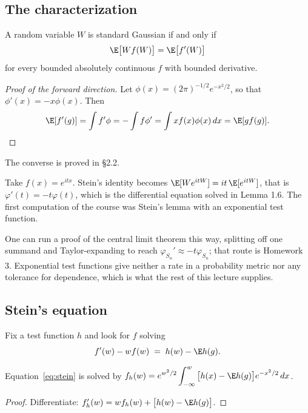 \documentclass[11pt]{article}
\begin{document}
\subsection{The characterization}

\begin{theorem}\label{thm:stein}
A random variable $W$ is standard Gaussian if and only if
\[
\E\big[Wf(W)\big]=\E\big[f'(W)\big]
\]
for every bounded absolutely continuous $f$ with bounded derivative.
\end{theorem}

\begin{proof}[Proof of the forward direction]
Let $\phi(x)=(2\pi)^{-1/2}e^{-x^2/2}$, so that $\phi'(x)=-x\phi(x)$. Then
\[
\E[f'(g)]=\int f'\phi=-\int f\phi'=\int xf(x)\phi(x)\,dx=\E[gf(g)] .
\]
\end{proof}

The converse is proved in \S2.2.

\begin{remark}
Take $f(x)=e^{itx}$. Stein's identity becomes $\E[We^{itW}]=it\,\E[e^{itW}]$, that is $\varphi'(t)=-t\varphi(t)$, which is the differential equation solved in Lemma 1.6. The first computation of the course was Stein's lemma with an exponential test function.

One can run a proof of the central limit theorem this way, splitting off one summand and Taylor-expanding to reach $\varphi_{S_n}'\approx-t\varphi_{S_n}$; that route is Homework 3. Exponential test functions give neither a rate in a probability metric nor any tolerance for dependence, which is what the rest of this lecture supplies.
\end{remark}

\subsection{Stein's equation}

Fix a test function $h$ and look for $f$ solving
\begin{equation}\label{eq:stein}
f'(w)-wf(w)\;=\;h(w)-\E h(g).
\end{equation}

\begin{lemma}\label{lem:steinsol}
Equation~\eqref{eq:stein} is solved by $\displaystyle f_h(w)=e^{w^2/2}\int_{-\infty}^{w}\big[h(x)-\E h(g)\big]e^{-x^2/2}\,dx$.
\end{lemma}

\begin{proof}
Differentiate: $f_h'(w)=wf_h(w)+\big[h(w)-\E h(g)\big]$.
\end{proof}
\end{document}
